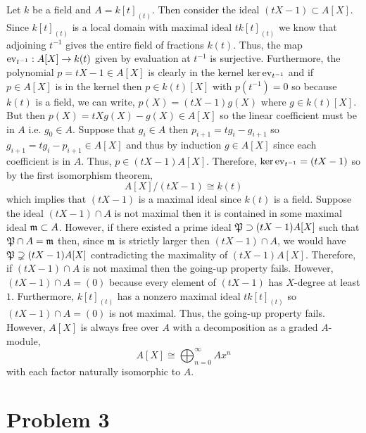 \documentclass[12pt]{extarticle}
\begin{document}
Let $k$ be a field and $A = k[t]_{(t)}$. Then consider the ideal $(tX - 1) \subset A[X]$. Since $k[t]_{(t)}$ is a local domain with maximal ideal $t k[t]_{(t)}$ we know that adjoining $t^{-1}$ gives the entire field of fractions $k(t)$. Thus, the map $\ev_{t^{-1}} : A[X] \to k(t)$ given by evaluation at $t^{-1}$ is surjective. Furthermore, the polynomial $p = tX - 1 \in A[X]$ is clearly in the kernel $\ker{\ev_{t^{-1}}}$ and if $p \in A[X]$ is in the kernel then $p \in k(t)[X]$ with $p(t^{-1}) = 0$ so because $k(t)$ is a field, we can write, $p(X) = (t X - 1) g(X)$ where $g \in k(t)[X]$. But then $p(X) = t X g(X) - g(X) \in A[X]$ so the linear coefficient must be in $A$ i.e. $g_0 \in A$. Suppose that $g_i \in A$ then $p_{i+1} = t g_i - g_{i+1}$ so $g_{i+1} = t g_i - p_{i + 1} \in A[X]$ and thus by induction $g \in A[X]$ since each coefficient is in $A$. Thus, $p \in (t X - 1) A[X]$. Therefore, $\ker{\ev_{t^{-1}}} = (t X - 1)$ so by the first isomorphism theorem,
\[ A[X] / (t X - 1) \cong k(t) \]
which implies that $(t X - 1)$ is a maximal ideal since $k(t)$ is a field. Suppose the ideal $(t X - 1) \cap A$ is not maximal then it is contained in some maximal ideal $\m \subset A$. However, if there existed a prime ideal $\P \supset (t X - 1) A[X]$ such that $\P \cap A = \m$ then, since $\m$ is strictly larger then $(t X - 1) \cap A$, we would have
$\P \supsetneq (t X - 1) A[X]$ contradicting the maximality of $(t X - 1) A[X]$. Therefore, if $(t X - 1) \cap A$ is not maximal then the going-up property fails. However, $(t X - 1) \cap A = (0)$ because every element of $(t X - 1)$ has $X$-degree at least $1$. Furthermore, $k[t]_{(t)}$ has a nonzero maximal ideal $t k[t]_{(t)}$ so $(t X - 1) \cap A = (0)$ is not maximal. Thus, the going-up property fails. 
However, $A[X]$ is always free over $A$ with a decomposition as a graded $A$-module,
\[ A[X] \cong \bigoplus_{n = 0}^{\infty} A x^n \]
with each factor naturally isomorphic to $A$. 
\section*{Problem 3}
\end{document}
